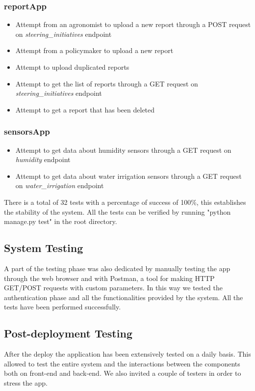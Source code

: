 \documentclass[table, 12pt]{article}
\begin{document}
\subsubsection*{reportApp}
\begin{itemize}
    \item Attempt from an agronomist to upload a new report through a POST request on \textit{steering\_initiatives} endpoint
    \item Attempt from a policymaker to upload a new report
    \item Attempt to upload duplicated reports
    \item Attempt to get the list of reports through a GET request on \textit{steering\_initiatives} endpoint
    \item Attempt to get a report that has been deleted
\end{itemize}
\subsubsection*{sensorsApp}
\begin{itemize}
    \item Attempt to get data about humidity sensors through a GET request on \textit{humidity} endpoint
    \item Attempt to get data about water irrigation sensors through a GET request on \textit{water\_irrigation} endpoint
\end{itemize}

There is a total of 32 tests with a percentage of success of 100\%, this establishes the stability of the system.
All the tests can be verified by running "python manage.py test" in the root directory.

\subsection{System Testing}
A part of the testing phase was also dedicated by manually testing the app through the web browser and with Postman, a tool for making HTTP GET/POST requests with custom parameters.
In this way we tested the authentication phase and all the functionalities provided by the system.
All the tests have been performed successfully.

\subsection{Post-deployment Testing}
After the deploy the application has been extensively tested on a daily basis. This allowed to test the entire system and the interactions between the components both on front-end and back-end.
We also invited a couple of testers in order to stress the app.
\end{document}
